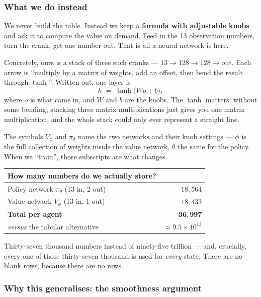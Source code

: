 \documentclass[11pt,a4paper]{article}
\begin{document}
\subsubsection*{What we do instead}

We never build the table. Instead we keep a \textbf{formula with adjustable knobs} and ask
it to compute the value on demand. Feed in the 13 observation numbers, turn the crank, get
one number out. That is all a neural network is here.

Concretely, ours is a stack of three such cranks --- $13 \to 128 \to 128 \to \text{out}$.
Each arrow is ``multiply by a matrix of weights, add an offset, then bend the result through
$\tanh$''. Written out, one layer is
\[
  h \;=\; \tanh\!\big(W o + b\big),
\]
where $o$ is what came in, and $W$ and $b$ are the knobs. The $\tanh$ matters: without some
bending, stacking three matrix multiplications just gives you one matrix multiplication, and
the whole stack could only ever represent a straight line.

The symbols $V_\phi$ and $\pi_\theta$ name the two networks and their knob settings ---
$\phi$ is the full collection of weights inside the value network, $\theta$ the same for the
policy. When we ``train'', those subscripts are what changes.

\begin{center}
\small
\begin{tabular}{lr}
\toprule
\textbf{How many numbers do we actually store?} & \\
\midrule
Policy network $\pi_\theta$ (13 in, 2 out)   & $18{,}564$ \\
Value network  $V_\phi$ (13 in, 1 out)       & $18{,}433$ \\
\midrule
\textbf{Total per agent}                     & $\mathbf{36{,}997}$ \\
\addlinespace
\emph{versus} the tabular alternative        & $\approx 9.5\times10^{13}$ \\
\bottomrule
\end{tabular}
\end{center}

Thirty-seven thousand numbers instead of ninety-five trillion --- and, crucially, every one
of those thirty-seven thousand is used for \emph{every} state. There are no blank rows,
because there are no rows.

\subsubsection*{Why this generalises: the smoothness argument}
\end{document}
